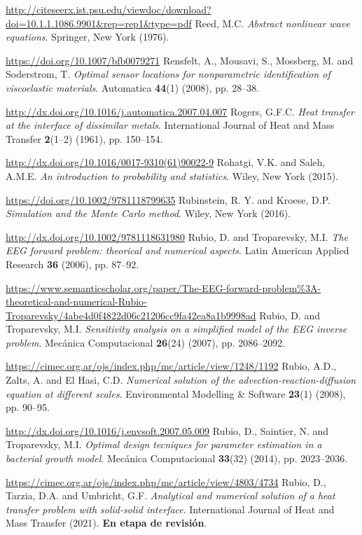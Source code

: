 \begin{thebibliography}{301}
\url{http://citeseerx.ist.psu.edu/viewdoc/download?doi=10.1.1.1086.9901&rep=rep1&type=pdf}
%
%
 Reed, M.C. {\it Abstract nonlinear wave equations}. Springer, New York (1976).

\url{https://doi.org/10.1007/bfb0079271}
%
%
 Rensfelt, A., Mousavi, S., Mossberg, M. and Soderstrom, T. {\it Optimal sensor locations for nonparametric identification of viscoelastic materials}. Automatica {\bf 44}(1) (2008), pp. 28--38.

\url{http://dx.doi.org/10.1016/j.automatica.2007.04.007}
%
%
 Rogers, G.F.C. {\it Heat transfer at the interface of dissimilar metals}. International Journal of Heat and Mass Transfer {\bf 2}(1--2) (1961), pp. 150--154.

\url{http://dx.doi.org/10.1016/0017-9310(61)90022-9}
%
%
 Rohatgi, V.K. and Saleh, A.M.E. {\it An introduction to probability and statistics}. Wiley, New York (2015). 

\url{https://doi.org/10.1002/9781118799635}
%
%
 Rubinstein, R. Y. and Kroese, D.P. {\it Simulation and the Monte Carlo method}. Wiley, New York (2016).

\url{http://dx.doi.org/10.1002/9781118631980}
%
%
 Rubio, D. and Troparevsky, M.I. {\it The EEG forward problem: theorical and numerical aspects}. Latin American Applied Research {\bf 36} (2006), pp. 87--92.

\url{https://www.semanticscholar.org/paper/The-EEG-forward-problem\%3A-theoretical-and-numerical-Rubio-Troparevsky/4abe4d0f4822d06c21206cc9fa42ea8a1b9998ad}
%
%
 Rubio, D. and Troparevsky, M.I. {\it Sensitivity analysis on a simplified model of the EEG inverse problem}. Mec\'anica Computacional {\bf 26}(24) (2007), pp. 2086--2092.

\url{https://cimec.org.ar/ojs/index.php/mc/article/view/1248/1192}
%
%
 Rubio, A.D., Zalts, A. and El Hasi, C.D. {\it Numerical solution of the advection-reaction-diffusion equation at different scales}. Environmental Modelling \& Software {\bf 23}(1) (2008), pp. 90--95.

\url{http://dx.doi.org/10.1016/j.envsoft.2007.05.009}
%
%
 Rubio, D., Saintier, N. and Troparevsky, M.I. {\it Optimal design tecniques for parameter estimation in a bacterial growth model}. Mec\'anica Computacional {\bf 33}(32) (2014), pp. 2023--2036.

\url{https://cimec.org.ar/ojs/index.php/mc/article/view/4803/4734}
%
%
 Rubio, D., Tarzia, D.A. and Umbricht, G.F. {\it Analytical and numerical solution of a heat transfer problem with solid-solid interface}. International Journal of Heat and Mass Transfer (2021). {\bf En etapa de revisi\'on}.


\end{thebibliography}
